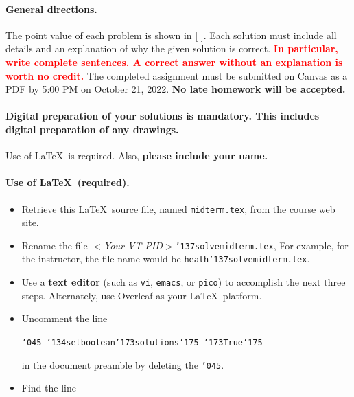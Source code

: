 \documentclass[11pt,twoside]{article}
\newcommand{\mybackslash}{\char'134}
\newcommand{\myleftbracket}{\char'173}
\newcommand{\myrightbracket}{\char'175}
\newcommand{\mypercent}{\char'045}
\newcommand{\myunderscore}{\char'137}
\newcommand{\duedate}{October 21, 2022}
\newcounter{problem}
\begin{document}
{
\begingroup %
\paragraph{General directions.}
The point value of each problem is shown in [ ].
Each solution must include all details and
an explanation of why the given solution is correct.
\textbf{\textcolor{red}{In particular,
write complete sentences.
A correct answer without an explanation is worth no credit.}}
The completed assignment must be submitted on Canvas as a PDF by 5:00 PM
on \duedate.
\textbf{No late homework will be accepted.}

\paragraph{Digital preparation of your solutions is mandatory.
This includes digital preparation of any drawings.}
Use of \LaTeX\ is required.
Also,
\textbf{please include your name.}

\paragraph{Use of \LaTeX\ (required).}
\begin{itemize}
\item Retrieve this \LaTeX\ source file,
named
\texttt{midterm.tex},
from the course web site.
\item Rename the file
\textit{$<$Your VT PID$>$}\texttt{{\myunderscore}solvemidterm.tex},
For example,
for the instructor,
the file name would be
\texttt{heath{\myunderscore}solvemidterm.tex}.

\item
Use a \textbf{text editor}
(such as \texttt{vi}, \texttt{emacs}, or \texttt{pico})
to accomplish the next three steps.
Alternately,
use Overleaf as your \LaTeX\ platform.

\item
Uncomment the line

\texttt{{\mypercent} 
{\mybackslash}setboolean{\myleftbracket}solutions{\myrightbracket}%
{\myleftbracket}True{\myrightbracket}}

in the document preamble by deleting the \texttt{\mypercent}.

\item
Find the line


\end{itemize}}
\end{document}
